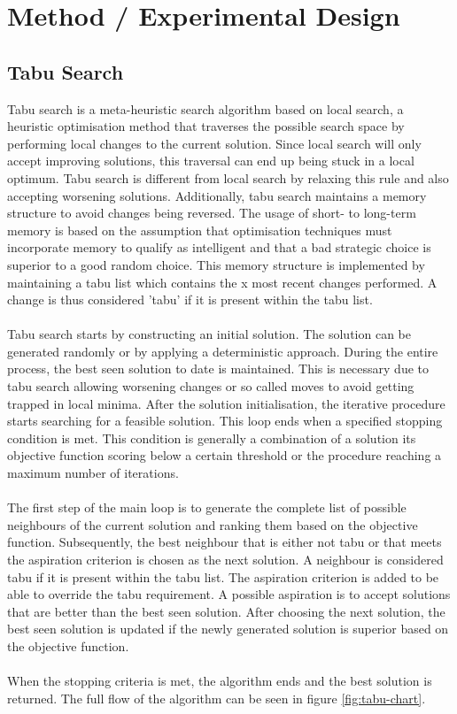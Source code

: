 
\section{Method / Experimental Design}\label{sec:method}
\subsection{Tabu Search}

Tabu search \cite{glover1993} is a meta-heuristic search algorithm based on local search, a heuristic optimisation method that traverses the possible search space by performing local changes to the current solution. Since local search will only accept improving solutions, this traversal can end up being stuck in a local optimum. Tabu search is different from local search by relaxing this rule and also accepting worsening solutions. Additionally, tabu search maintains a memory structure to avoid changes being reversed. The usage of short- to long-term memory is  based on the assumption that optimisation techniques must incorporate memory to qualify as intelligent and that a bad strategic choice is superior to a good random choice\cite{glover1999}. This memory structure is implemented by maintaining a tabu list which contains the x most recent changes performed. A change is thus considered 'tabu' if it is present within the tabu list.
\\\\
Tabu search starts by constructing an initial solution. The solution can be generated randomly or by applying a deterministic approach. During the entire process, the best seen solution to date is maintained. This is necessary due to tabu search allowing worsening changes or so called moves to avoid getting trapped in local minima. After the solution initialisation, the iterative procedure starts searching for a feasible solution. This loop ends when  a specified stopping condition is met. This condition is generally a combination of a solution its objective function scoring below a certain threshold or the procedure reaching a maximum number of iterations.
\\\\
The first step of the main loop is to generate the complete list of possible neighbours of the current solution and ranking them based on the objective function. Subsequently, the best neighbour that is either not tabu or that meets the aspiration criterion is chosen as the next solution. A neighbour is considered tabu if it is present within the tabu list. The aspiration criterion is added to be able to override the tabu requirement. A possible aspiration is to accept solutions that are better than the best seen solution. After choosing the next solution, the best seen solution is updated if the newly generated solution is superior based on the objective function.
\\\\
When the stopping criteria is met, the algorithm ends and the best solution is returned. The full flow of the algorithm can be seen in figure \ref{fig:tabu-chart}.

